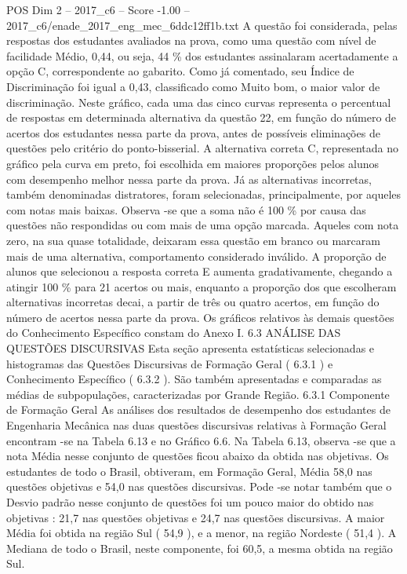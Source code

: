 \begin{textsample}{POS Dim 2 – 2017\_c6 – Score -1.00 – 2017\_c6/enade\_2017\_eng\_mec\_6ddc12ff1b.txt}
A questão foi considerada, pelas respostas dos estudantes avaliados na prova, como uma questão com nível de facilidade Médio, 0,44, ou seja, 44 \% dos estudantes assinalaram acertadamente a opção C, correspondente ao gabarito.
Como já comentado, seu Índice de Discriminação foi igual a 0,43, classificado como Muito bom, o maior valor de discriminação.
Neste gráfico, cada uma das cinco curvas representa o percentual de respostas em determinada alternativa da questão 22, em função do número de acertos dos estudantes nessa parte da prova, antes de possíveis eliminações de questões pelo critério do ponto-bisserial.
A alternativa correta C, representada no gráfico pela curva em preto, foi escolhida em maiores proporções pelos alunos com desempenho melhor nessa parte da prova.
Já as alternativas incorretas, também denominadas distratores, foram selecionadas, principalmente, por aqueles com notas mais baixas.
Observa -se que a soma não é 100 \% por causa das questões não respondidas ou com mais de uma opção marcada.
Aqueles com nota zero, na sua quase totalidade, deixaram essa questão em branco ou marcaram mais de uma alternativa, comportamento considerado inválido.
A proporção de alunos que selecionou a resposta correta E aumenta gradativamente, chegando a atingir 100 \% para 21 acertos ou mais, enquanto a proporção dos que escolheram alternativas incorretas decai, a partir de três ou quatro acertos, em função do número de acertos nessa parte da prova.
Os gráficos relativos às demais questões do Conhecimento Específico constam do Anexo I. 6.3 ANÁLISE DAS QUESTÕES DISCURSIVAS Esta seção apresenta estatísticas selecionadas e histogramas das Questões Discursivas de Formação Geral ( 6.3.1 ) e Conhecimento Específico ( 6.3.2 ).
São também apresentadas e comparadas as médias de subpopulações, caracterizadas por Grande Região. 6.3.1 Componente de Formação Geral As análises dos resultados de desempenho dos estudantes de Engenharia Mecânica nas duas questões discursivas relativas à Formação Geral encontram -se na Tabela 6.13 e no Gráfico 6.6.
Na Tabela 6.13, observa -se que a nota Média nesse conjunto de questões ficou abaixo da obtida nas objetivas.
Os estudantes de todo o Brasil, obtiveram, em Formação Geral, Média 58,0 nas questões objetivas e 54,0 nas questões discursivas.
Pode -se notar também que o Desvio padrão nesse conjunto de questões foi um pouco maior do obtido nas objetivas : 21,7 nas questões objetivas e 24,7 nas questões discursivas.
A maior Média foi obtida na região Sul ( 54,9 ), e a menor, na região Nordeste ( 51,4 ).
A Mediana de todo o Brasil, neste componente, foi 60,5, a mesma obtida na região Sul.

\end{textsample}
